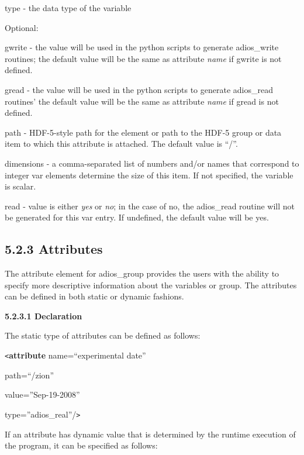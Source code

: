 type - the data type of the variable

\leftskip=0pt
\parindent=0pt
Optional: 

\leftskip=72pt
\parindent=-50pt
gwrite - the value will be used in the python scripts to generate adios\_write 
routines; the default value will be the same as attribute \textit{name} if gwrite 
is not defined.

\leftskip=67pt
\parindent=-45pt
gread - the value will be used in the python scripts to generate adios\_read routines' 
the default value will be the same as attribute \textit{name} if  gread is not 
defined.

\leftskip=58pt
\parindent=-36pt
path - HDF-5-style path for the element or path to the HDF-5 group or data item 
to which this attribute is attached.  The default value is ``/''.

\leftskip=94pt
\parindent=-72pt
dimensions - a comma-separated list of numbers and/or names that correspond to 
integer var elements determine the size of this item. If not specified, the variable 
is scalar.

\leftskip=58pt
\parindent=-36pt
read - value is either \textit{yes} or \textit{no}; in the case of no, the adios\_read 
routine will not be generated for this var entry. If undefined, the default value 
will be yes. \label{HToc82064271}\label{HToc82067521}\label{HToc84890245}\label{HToc212016621}\label{HToc212016863}\label{HRef278897265}\label{HToc182553368}

\subsection*{{\large \textbf{5.2.3 Attributes}}}

\leftskip=0pt
\parindent=0pt
The attribute element for adios\_group provides the users with the ability to specify 
more descriptive information about the variables or group. The attributes can be 
defined in both static or dynamic fashions. \label{HToc82064272}

\textbf{5.2.3.1 Declaration}

The static type of attributes can be defined as follows:

\texttt{<}\textbf{attribute} name=``experimental date'' 

\leftskip=27pt
\parindent=43pt
path=``/zion''

value=''Sep-19-2008''

\parindent=0pt
type=''adios\_real''/\texttt{>}

\leftskip=0pt
If an attribute has dynamic value that is determined by the runtime execution of 
the program, it can be specified as follows:

